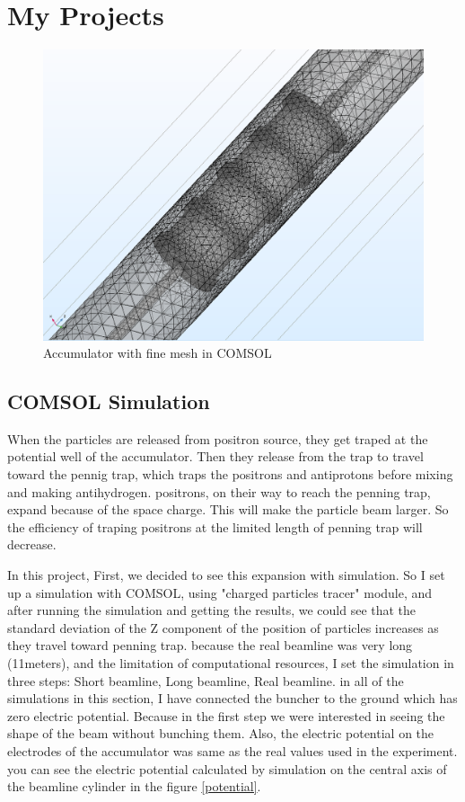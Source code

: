 \documentclass[12pt,a4paper]{article}
\begin{document}
\section{My Projects}

\begin{figure}[h]
\centering
\includegraphics[scale=0.3]{Mesh}
\caption{Accumulator with fine mesh in COMSOL}
\end{figure}

\subsection{COMSOL Simulation}
When the particles are released from positron source, they get traped at the potential well of the accumulator. Then they release from the trap to travel toward the pennig trap, which traps the positrons and antiprotons before mixing and making antihydrogen.  positrons, on their way to reach the penning trap, expand because of the space charge. This will make the particle beam larger. So the efficiency of traping positrons at the limited length of penning trap will decrease.


In this project, First, we decided to see this expansion with simulation. So I set up a simulation with COMSOL, using "charged particles tracer" module, and after running the simulation and getting the results, we could see that the standard deviation of the Z component of the position of particles increases as they travel toward penning trap. because the real beamline was very long (11meters), and the limitation of computational resources, I set the simulation in three steps: Short beamline, Long beamline, Real beamline. in all of the simulations in this section, I have connected the buncher to the ground which has zero electric potential. Because in the first step we were interested in seeing the shape of the beam without bunching them. Also, the electric potential on the electrodes of the accumulator was  same as the real values used in the experiment. you can see the electric potential calculated by simulation on the central axis of the beamline cylinder in the figure \ref{potential}.
\end{document}
